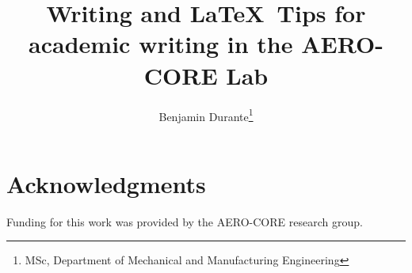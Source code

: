 \documentclass[journal]{new-aiaa} %
\title{Writing and \LaTeX\ Tips for academic writing in the AERO-CORE Lab} %
\author{
	Benjamin Durante\footnote{MSc, Department of Mechanical and Manufacturing Engineering}
}
\affil{University of Calgary, Calgary, Alberta, Canada, T2N 4V8}
\begin{document}

	\maketitle
	
	\tableofcontents
	
	
	
	
	
	


	\section*{Acknowledgments}
	Funding for this work was provided by the AERO-CORE research group. 

	
	
	
\end{document}
